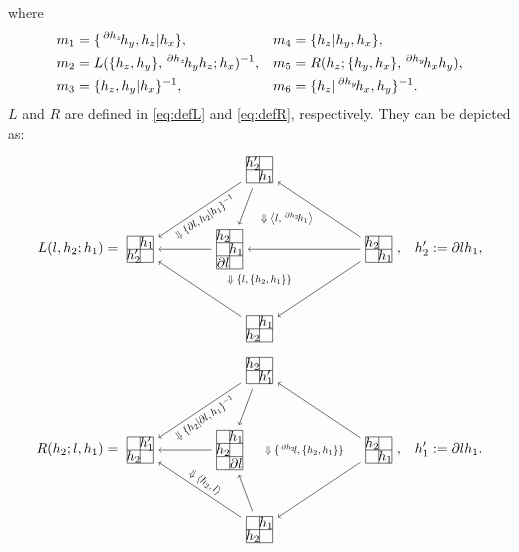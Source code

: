 \documentclass[11pt, reqno]{amsart} %
\newcommand{\act}[1]{\,\sp{#1}\!}
\newcommand{\strrect}[3][]{
  \begin{scope}[every node/.append style={overlay},#1]
    \foreach \x [count=\i] in {#3}{
      \ifx\x\empty
      \else
        \pgfmathsetmacro{\modResult}{mod(\i-1, #2)}
        \pgfmathsetmacro{\quotResult}{(\i-\modResult-1)/#2}
        \node at (\modResult,-\quotResult) {\x};
      \fi
    }
    \foreach \x in {0,1,...,#2}{
      \draw ({-1/2+\x},{1/2})--({-1/2+\x},{-#2+1/2});
      \draw ({-1/2},{1/2-\x})--({#2-1/2},{1/2-\x});
    }
  \end{scope}
}
\newcommand{\strsquare}[4][]{
  \begin{scope}[every node/.append style={overlay},#1]
    \foreach \x [count=\i] in {#4}{
      \ifx\x\empty
      \else
        \pgfmathsetmacro{\modResult}{mod(\i-1, #2)}
        \pgfmathsetmacro{\quotResult}{(\i-\modResult-1)/#2}
        \node at (\modResult,-\quotResult) {\x};
      \fi
    }
    \foreach \x in {0,1,...,#2}{
      \draw ({-1/2+\x},{1/2})--({-1/2+\x},{-#3+1/2});
    }
    \foreach \y in {0,1,...,#3}{
      \draw ({-1/2},{1/2-\y})--({#2-1/2},{1/2-\y});
    }
  \end{scope}
}
\theoremstyle{definition}
\theoremstyle{remark}
\numberwithin{equation}{section}
\begin{document}
where
\begin{align*}
  m_1 &= \{\act{\partial h_z}h_y,h_z|h_x\}, &
  m_4 &= \{h_z|h_y,h_x\},\\
  m_2 &= L(\{h_z,h_y\},\act{\partial h_z}h_yh_z;h_x)^{-1}, &
  m_5 &= R(h_z;\{h_y,h_x\},\act{\partial h_y}h_xh_y), \\
  m_3 &= \{h_z,h_y|h_x\}^{-1}, &
  m_6 &= \{h_z|\act{\partial h_y}h_x,h_y\}^{-1}.
\end{align*}
$L$ and $R$ are defined in \eqref{eq:defL} and \eqref{eq:defR}, respectively. They can be depicted as:
\begin{align*}
  L(l,h_2;h_1) &= 
  \begin{tikzpicture}[baseline=-2pt]
    \node (A) at (3,0) {\tikz[baseline=-2pt,scale=.33]{\strrect{2}{$h_2$,,,$h_1$}}};
    \node (B1) at (0,2) {\tikz[baseline=-2pt,scale=.33]{\strrect{2}{$h_2'$,,,$h_1$}}};
    \node (B2) at (0,-2) {\tikz[baseline=-2pt,scale=.33]{\strrect{2}{,$h_1$,$h_2$,}}};
    \node (C) at (-3,0) {\tikz[baseline=-2pt,scale=.33]{\strrect{2}{,$h_1$,$h_2'$,}}};
    \node (D) at (-.75,0) {\tikz[baseline=-2pt,scale=.33]{\strsquare{2}{3}{$h_2$,,,$h_1$,$\partial l$,}}};
    \draw [->] (A) to (B1);
    \draw [->] (A) to (B2);
    \draw [->] (B1) to node [sloped,transform shape,scale=.75,anchor=north] {$\Downarrow \{\partial l,h_2|h_1\}^{-1}$} (C);
    \draw [->] (B2) to (C);
    \draw [->] (A) to coordinate (E) (D);
    \draw [->] (B1) to (D);
    \draw [->] (D) to (C);
    \path (B1) to node [pos=3/4,transform shape,scale=.75] {$\Downarrow \{l,\{h_2,h_1\}\}$} (B2);
    \path (B1) to node [transform shape,scale=.75] {$\Downarrow \left<l,\act{\partial h_2}h_1\right>$} (E);
  \end{tikzpicture}, &
  h_2' &:= \partial lh_1, \\
  R(h_2;l,h_1) &= 
  \begin{tikzpicture}[baseline=-2pt]
    \node (A) at (3,0) {\tikz[baseline=-2pt,scale=.33]{\strrect{2}{$h_2$,,,$h_1$}}};
    \node (B1) at (0,2) {\tikz[baseline=-2pt,scale=.33]{\strrect{2}{$h_2$,,,$h_1'$}}};
    \node (B2) at (0,-2) {\tikz[baseline=-2pt,scale=.33]{\strrect{2}{,$h_1$,$h_2$,}}};
    \node (C) at (-3,0) {\tikz[baseline=-2pt,scale=.33]{\strrect{2}{,$h_1'$,$h_2$,}}};
    \node (D) at (-.75,0) {\tikz[baseline=-2pt,scale=.33]{\strsquare{2}{3}{,$h_1$,$h_2$,,,$\partial l$}}};
    \draw [->] (A) to (B1);
    \draw [->] (A) to (B2);
    \draw [->] (B1) to node [sloped,transform shape,scale=.75,anchor=north] {$\Downarrow \{h_2|\partial l,h_1\}^{-1}$} (C);
    \draw [->] (B2) to node [sloped,transform shape,scale=.75,anchor=south] {$\Downarrow \left<h_2,l\right>$} (C);
    \draw [->] (B1) to (D);
    \draw [->] (B2) to (D);
    \draw [->] (D) to (C);
    \path [->] (A) to node [transform shape,scale=.75] {$\Downarrow \{\act{\partial h_2}l,\{h_2,h_1\}\}$} (D);
  \end{tikzpicture}, &
  h_1' &:= \partial lh_1.
\end{align*}
\end{document}
